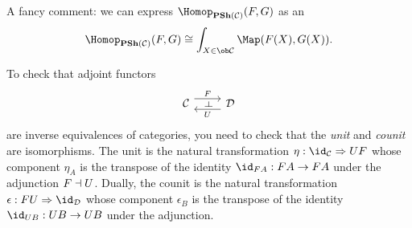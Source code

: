 \documentclass[../main.tex]{subfiles}
\begin{document}
A fancy comment: we can express $\Hom[\catPresheaf(\cat C)](F,G)$ as an 
\[ \Hom[\catPresheaf(\cat C)](F,G) \cong \int_{X\in\ob\cat C} \Map(F(X),G(X))\text{.} \]

\begin{rmk}
To check that adjoint functors
\begin{equation*}
  \begin{tikzcd}
    \cat C \ar[r, "{F}"{name=leftadj}, shift left=2] & \cat D \ar[l, "U"{name=rightadj}, shift left=2]
    \ar[from=leftadj, to=rightadj, phantom, "\leftadj" marking]
  \end{tikzcd}
\end{equation*}
are inverse equivalences of categories, you need to check that the \emph{unit} and \emph{counit} are isomorphisms.
The unit is the natural transformation $\eta\colon\id_{\cat C}\To UF$ whose component $\eta_A$ is the transpose of the identity $\id_{FA}\colon FA\to FA$ under the adjunction $F\dashv U$.
Dually, the counit is the natural transformation $\epsilon\colon FU\To\id_{\cat D}$ whose component $\epsilon_B$ is the transpose of the identity $\id_{UB}\colon UB\to UB$ under the adjunction.
\end{rmk}
\end{document}
